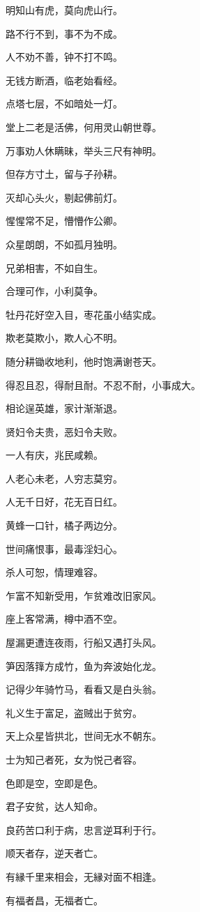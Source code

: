 \documentclass[12pt,oneside]{book}
\begin{document}
明知山有虎，莫向虎山行。

路不行不到，事不为不成。

人不劝不善，钟不打不鸣。

无钱方断酒，临老始看经。

点塔七层，不如暗处一灯。

堂上二老是活佛，何用灵山朝世尊。

万事劝人休瞒昧，举头三尺有神明。

但存方寸土，留与子孙耕。

灭却心头火，剔起佛前灯。

惺惺常不足，懵懵作公卿。

众星朗朗，不如孤月独明。

兄弟相害，不如自生。

合理可作，小利莫争。

牡丹花好空入目，枣花虽小结实成。

欺老莫欺小，欺人心不明。

随分耕锄收地利，他时饱满谢苍天。

得忍且忍，得耐且耐。不忍不耐，小事成大。

相论逞英雄，家计渐渐退。

贤妇令夫贵，恶妇令夫败。

一人有庆，兆民咸赖。

人老心未老，人穷志莫穷。

人无千日好，花无百日红。

黄蜂一口针，橘子两边分。

世间痛恨事，最毒淫妇心。

杀人可恕，情理难容。

乍富不知新受用，乍贫难改旧家风。

座上客常满，樽中酒不空。

屋漏更遭连夜雨，行船又遇打头风。

笋因落箨方成竹，鱼为奔波始化龙。

记得少年骑竹马，看看又是白头翁。

礼义生于富足，盗贼出于贫穷。

天上众星皆拱北，世间无水不朝东。

士为知己者死，女为悦己者容。

色即是空，空即是色。

君子安贫，达人知命。

良药苦口利于病，忠言逆耳利于行。

顺天者存，逆天者亡。

有縁千里来相会，无縁对面不相逢。

有福者昌，无福者亡。
\end{document}
